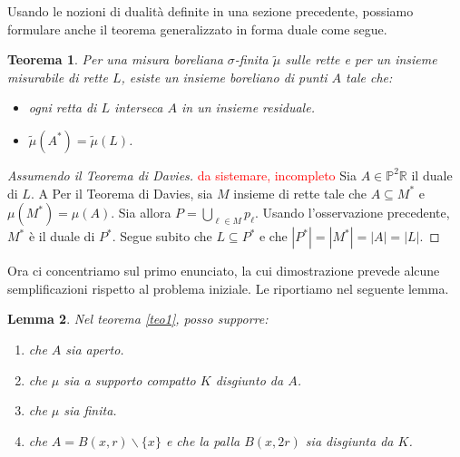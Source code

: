 \documentclass[a4paper, twoside,openright]{article}
\newcommand{\R}{\mathbb{R}}
\renewcommand{\P}{\mathbb{P}}
\newcommand{\<}{\langle}
\renewcommand{\>}{\rangle}
\newtheorem{teo}{Teorema}[]
\newtheorem{lemma}[teo]{Lemma}
\begin{document}
Usando le nozioni di dualità definite in una sezione precedente, possiamo formulare anche il teorema generalizzato in forma duale come segue.

\begin{teo}
	Per una misura boreliana $\sigma$-finita $\tilde \mu$ sulle rette e per un insieme misurabile di rette $L$, esiste un insieme boreliano di punti $A$ tale che:
	\begin{itemize}
		\item ogni retta di $L$ interseca $A$ in un insieme residuale.
		\item $\tilde \mu\left(A^{*}\right)=\tilde \mu(L)$.
	\end{itemize}
\end{teo}

\begin{proof}[Assumendo il Teorema di Davies]
	\textcolor{red}{da sistemare, incompleto}
	Sia $A \in \P^2\R$ il duale di $L$. A  Per il Teorema di Davies, sia $M$ insieme di rette tale che $A \subseteq M^*$ e $\mu(M^*)=\mu(A)$. Sia allora $P = \bigcup_{\ell\in M}p_\ell$. Usando l'osservazione precedente, $M^*$ è il duale di $P^*$. Segue subito che $L \subseteq P^*$ e che $|P^*|=|M^*|=|A|=|L|$.
\end{proof}

Ora ci concentriamo sul primo enunciato, la cui dimostrazione prevede alcune semplificazioni rispetto al problema iniziale. Le riportiamo nel seguente lemma.

\begin{lemma} \label{Aaperto}
	Nel teorema \ref{teo1}, posso supporre: 
	\begin{enumerate}
		\item che $A$ sia aperto.
		\item che $\mu$ sia a supporto compatto $K$ disgiunto da $A$.
		\item che $\mu$ sia finita.
		\item che $A=B(x, r) \backslash\{x\}$ e che la palla $B(x, 2 r)$ sia disgiunta da $K$.
	\end{enumerate}	
\end{lemma}
\end{document}
